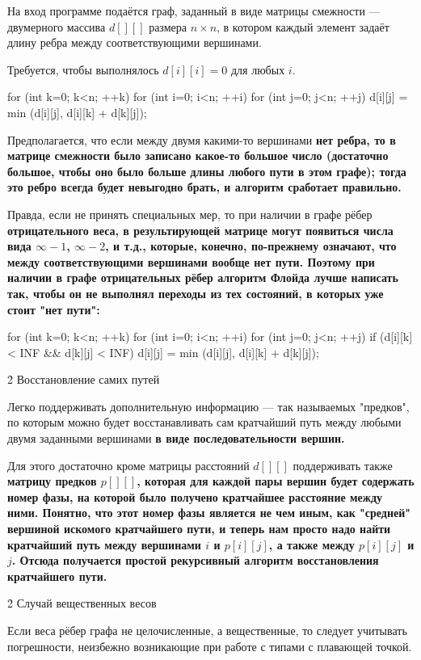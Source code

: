 На вход программе подаётся граф, заданный в виде матрицы смежности --- двумерного массива $d[][]$ размера $n \times n$, в котором каждый элемент задаёт длину ребра между соответствующими вершинами.

Требуется, чтобы выполнялось $d[i][i] = 0$ для любых $i$.

\code
for (int k=0; k<n; ++k)
	for (int i=0; i<n; ++i)
		for (int j=0; j<n; ++j)
			d[i][j] = min (d[i][j], d[i][k] + d[k][j]);
\endcode

Предполагается, что если между двумя какими-то вершинами \bf{нет ребра}, то в матрице смежности было записано какое-то большое число (достаточно большое, чтобы оно было больше длины любого пути в этом графе); тогда это ребро всегда будет невыгодно брать, и алгоритм сработает правильно.

Правда, если не принять специальных мер, то при наличии в графе рёбер \bf{отрицательного веса}, в результирующей матрице могут появиться числа вида $\infty-1$, $\infty-2$, и т.д., которые, конечно, по-прежнему означают, что между соответствующими вершинами вообще нет пути. Поэтому при наличии в графе отрицательных рёбер алгоритм Флойда лучше написать так, чтобы он не выполнял переходы из тех состояний, в которых уже стоит "нет пути":

\code
for (int k=0; k<n; ++k)
	for (int i=0; i<n; ++i)
		for (int j=0; j<n; ++j)
			if (d[i][k] < INF && d[k][j] < INF)
				d[i][j] = min (d[i][j], d[i][k] + d[k][j]);
\endcode


\h2{ Восстановление самих путей }

Легко поддерживать дополнительную информацию --- так называемых "предков", по которым можно будет восстанавливать сам кратчайший путь между любыми двумя заданными вершинами \bf{в виде последовательности вершин}.

Для этого достаточно кроме матрицы расстояний $d[][]$ поддерживать также \bf{матрицу предков} $p[][]$, которая для каждой пары вершин будет содержать номер фазы, на которой было получено кратчайшее расстояние между ними. Понятно, что этот номер фазы является не чем иным, как "средней" вершиной искомого кратчайшего пути, и теперь нам просто надо найти кратчайший путь между вершинами $i$ и $p[i][j]$, а также между $p[i][j]$ и $j$. Отсюда получается простой рекурсивный алгоритм восстановления кратчайшего пути.


\h2{ Случай вещественных весов }

Если веса рёбер графа не целочисленные, а вещественные, то следует учитывать погрешности, неизбежно возникающие при работе с типами с плавающей точкой.

